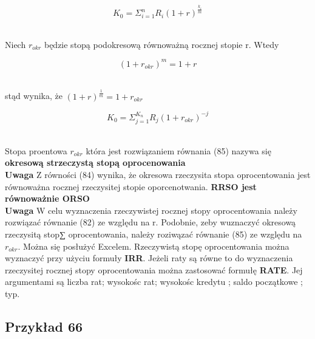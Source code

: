 \documentclass{article}
\begin{document}
\begin{center}
	\begin{equation}
		K_0 = \Sigma ^n_{i=1} R_i(1 + r)^{\frac{k_i}{m}}
	\end{equation}
\end{center}\\

Niech $ r_{okr} $ będzie stopą podokresową równoważną rocznej stopie r. Wtedy

\begin{center}
	\begin{equation}
		(1 + r_{okr})^m = 1 + r
	\end{equation}
\end{center}\\

stąd wynika, że $ (1 + r)^{\frac{1}{m}} = 1 + r_{okr} $

\begin{center}
	\begin{equation}
		K_0 = \Sigma ^{K_n}_{j=1} R_j(1 + r_{okr})^{-j}
	\end{equation}
\end{center}\\

Stopa proentowa $ r_{okr} $ która jest rozwiązaniem równania (85) nazywa się \textbf{okresową strzeczystą stopą oprocenowania}\\

\textbf{Uwaga} Z równości (84) wynika, że okresowa rzeczysita stopa oprocentowania jest równoważna rocznej rzeczysitej stopie oporcenotwania. \textbf{RRSO jest równoważnie ORSO}\\

\textbf{Uwaga} W celu wyznaczenia rzeczywistej rocznej stopy oprocentowania należy rozwiązać równanie (82) ze względu na r. Podobnie, zeby wuznaczyć okresową rzeczysitą stop∑ oprocentowania, należy roziwązać równanie (85) ze względu na $ r_{okr} $. Można się posłużyć Excelem. Rzeczywistą stopę oprocentowania można wyznaczyć przy użyciu formuły \textbf{IRR}. Jeżeli raty są równe to do wyznaczenia rzeczysitej rocznej stopy oprocentowania można zastosować formułę \textbf{RATE}. Jej argumentami są liczba rat; wysokośc rat; wysokośc kredytu ; saldo początkowe ; typ.\\

\subsection{Przykład 66}
\end{document}
